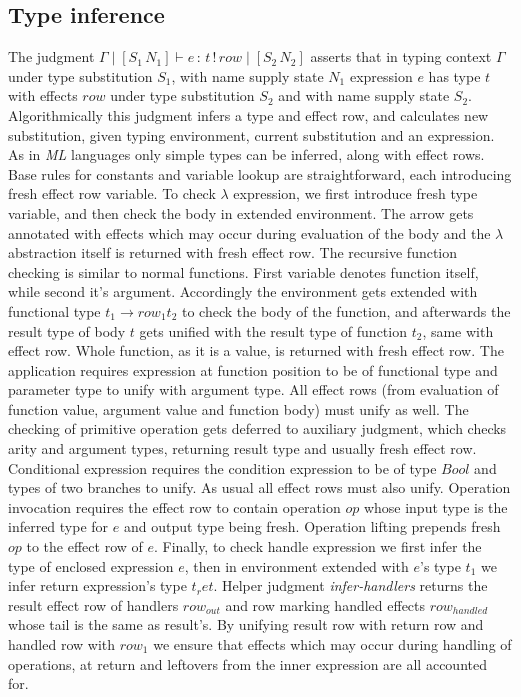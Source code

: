\documentclass[inz, english, shortabstract]{iithesis}
\begin{document}
\subsection{Type inference}
The judgment $ \Gamma \mid [S_1 \, N_1] \vdash e \, : \, t \, ! \, row \mid [S_2 \, N_2] $ asserts that in typing context $ \Gamma $ under type substitution $ S_1 $, with name supply state $ N_1 $ expression $ e $ has type $ t $ with effects $ row $ under type substitution $ S_2 $ and with name supply state $ S_2 $.
Algorithmically this judgment infers a type and effect row, and calculates new substitution, given typing environment, current substitution and an expression.
As in \emph{ML} languages only simple types can be inferred, along with effect rows.
Base rules for constants and variable lookup are straightforward, each introducing fresh effect row variable.
To check $ \lambda $ expression, we first introduce fresh type variable, and then check the body in extended environment.
The arrow gets annotated with effects which may occur during evaluation of the body and the $ \lambda $ abstraction itself is returned with fresh effect row.
The recursive function checking is similar to normal functions.
First variable denotes function itself, while second it's argument.
Accordingly the environment gets extended with functional type $ t_1 \rightarrow row_1 t_2 $ to check the body of the function, and afterwards the result type of body $ t $ gets unified with the result type of function $ t_2 $, same with effect row.
Whole function, as it is a value, is returned with fresh effect row.
The application requires expression at function position to be of functional type and parameter type to unify with argument type.
All effect rows (from evaluation of function value, argument value and function body) must unify as well.
The checking of primitive operation gets deferred to auxiliary judgment, which checks arity and argument types, returning result type and usually fresh effect row.
Conditional expression requires the condition expression to be of type $ Bool $ and types of two branches to unify.
As usual all effect rows must also unify.
Operation invocation requires the effect row to contain operation $ op $ whose input type is the inferred type for $ e $ and output type being fresh.
Operation lifting prepends fresh $ op $ to the effect row of $ e $.
Finally, to check handle expression we first infer the type of enclosed expression $ e $, then in environment extended with $e$'s type $ t_1 $ we infer return expression's type $ t_ret $.
Helper judgment \textit{infer-handlers} returns the result effect row of handlers $ row_{out} $ and row marking handled effects $ row_{handled} $ whose tail is the same as result's.
By unifying result row with return row and handled row with $ row_1 $ we ensure that effects which may occur during handling of operations, at return and leftovers from the inner expression are all accounted for.
\end{document}
